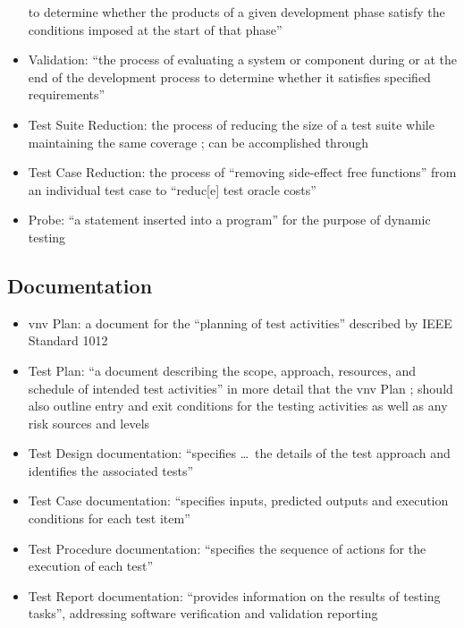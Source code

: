 \begin{itemize}
          to determine whether the products of a given development phase
          satisfy the conditions imposed at the start of that phase''
          \citep[p.~400]{vanVliet2000}
    \item Validation: ``the process of evaluating a system or component
          during or at the end of the development process to determine
          whether it satisfies specified requirements''
          \citep[p.~400]{vanVliet2000}
    \item Test Suite Reduction: the process of reducing the size of a test
          suite while maintaining the same coverage
          \citep[p.~519]{BarrEtAl2015}; can be accomplished through
    \item Test Case Reduction: the process of ``removing side-effect free
          functions'' from an individual test case to ``reduc[e] test oracle
          costs'' \citep[p.~519]{BarrEtAl2015}
    \item Probe: ``a statement inserted into a program'' for the purpose of
          dynamic testing \citep[p.~438]{PetersAndPedrycz2000}
\end{itemize}

\subsection{Documentation}

\begin{itemize}
    \item \acf{vnv} Plan: a document for the ``planning of test activities''
          described by IEEE Standard 1012 \citep[p.~411]{vanVliet2000}
    \item Test Plan: ``a document describing the scope, approach, resources,
          and schedule of intended test activities'' in more detail that the
          \acs{vnv} Plan \citep[pp.~412-413]{vanVliet2000};
          should also outline entry and exit conditions for the testing
          activities as well as any risk sources and levels
          \citep[p.~445]{PetersAndPedrycz2000}
    \item Test Design documentation: ``specifies \dots\ the details of the
          test approach and identifies the associated tests''
          \citep[p.~413]{vanVliet2000}
    \item Test Case documentation: ``specifies inputs, predicted outputs and
          execution conditions for each test item''
          \citep[p.~413]{vanVliet2000}
    \item Test Procedure documentation: ``specifies the sequence of actions
          for the execution of each test'' \citep[p.~413]{vanVliet2000}
    \item Test Report documentation: ``provides information on the results of
          testing tasks'', addressing software verification and validation
          reporting \citep[p.~413]{vanVliet2000}
\end{itemize}

